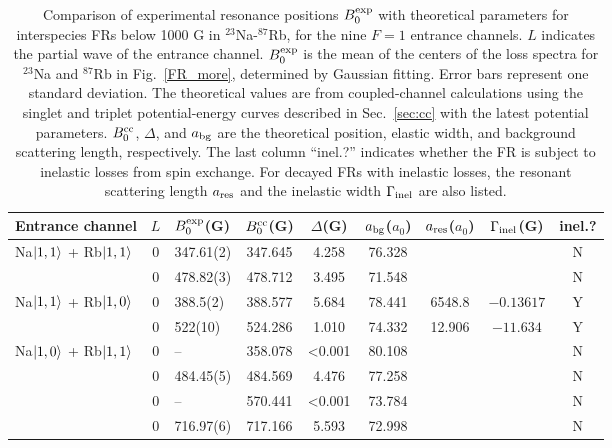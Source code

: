 \begin{sidewaystable}[thp]
\caption[Summary table of Na-Rb Feshbach resonances with different spin combinations]{Comparison of experimental resonance positions $B_0^{\rm exp}$ with theoretical parameters for interspecies FRs below 1000 G in $^{23}$Na-$^{87}$Rb, for the nine $F = 1$ entrance channels. $L$ indicates the partial wave of the entrance channel. $B_0^{\rm exp}$ is the mean of the centers of the loss spectra for $^{23}$Na and $^{87}$Rb in Fig.~\ref{FR_more}, determined by Gaussian fitting. Error bars represent one standard deviation. The theoretical values are from coupled-channel calculations using the singlet and triplet potential-energy curves described in Sec.~\ref{sec:cc} with the latest potential parameters. $B_0^{\rm cc}$, $\Delta$, and $a_{\rm bg}$ are the theoretical position, elastic width, and background scattering length, respectively. The last column ``inel.?'' indicates whether the FR is subject to inelastic losses from spin exchange. For decayed FRs with inelastic losses, the resonant scattering length $a_{\rm res}$ and the inelastic width $\Gamma_{\rm inel}$ are also listed.}
\label{fst}\centering
\begin{tabular}{l|c|l|c|c|c|c|c|c}
\hline\hline
Entrance channel 				& $L$ & $B_0^{\rm exp}$(G)	& $B_0^{\rm cc}$(G)	& $\Delta$(G)	& $a_{\rm bg}$($a_0$) & $a_{\rm res}$($a_0$) & $\Gamma_{\rm inel}$(G)	& inel.? \\
\hline
Na$\ket{1,1}$ + Rb$\ket{1,1}$   & 0    	& 347.61(2)       	& 347.645 			& 4.258  			 & 76.328  	& & & N     \\
					        	& 0 	& 478.82(3)        	& 478.712 			& 3.495  			 & 71.548   & & & N     \\ \hline
Na$\ket{1,1}$ + Rb$\ket{1,0}$   & 0    	& 388.5(2)          & 388.577 			& 5.684  & 78.441                 &6548.8 & $-0.13617$& Y     \\
								& 0    	& 522(10)           & 524.286 			& 1.010  & 74.332                 & 12.906& $-11.634$& Y     \\ \hline
Na$\ket{1,0}$ + Rb$\ket{1,1}$   & 0   	&  	--		        & 358.078 			& <0.001  & 80.108                & & & N     \\
								& 0   	& 484.45(5)         & 484.569 			& 4.476  & 77.258                 & & & N     \\
								& 0		& 	--				& 570.441			& <0.001	& 73.784			 & & & N \\
								& 0   	& 716.97(6)         & 717.166 			& 5.593  & 72.998                 & & & N     \\  \hline

\end{tabular}
\end{sidewaystable}
